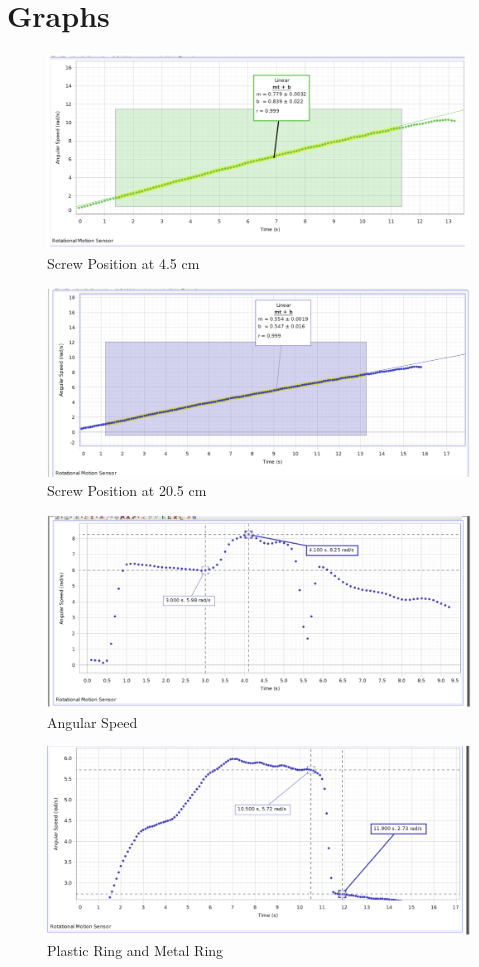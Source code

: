 \documentclass[12pt]{article}
\begin{document}
\section{Graphs}
\begin{figure}[H]
    \centering
\includegraphics[width=0.75\linewidth]{Screw-Position-4.5.png}
    \caption{Screw Position at 4.5 cm}
    \label{fig:enter-label}
\end{figure}

\begin{figure}
    \centering
\includegraphics[width=0.75\linewidth]{screw-position 20.5 cm.png}
    \caption{Screw Position at 20.5 cm}
        \label{fig:enter-label}
\end{figure}

\begin{figure}
        \centering
\includegraphics[width=0.75\linewidth]{Angular Speed.png}
        \caption{Angular Speed}
        \label{fig:enter-label}
    \end{figure}
\begin{figure}
    \centering
    \includegraphics[width=0.75\linewidth]{Plastic Disk and Metal Ring.png}
    \caption{Plastic Ring and Metal Ring}
    \label{fig:enter-label}
\end{figure}
\end{document}
